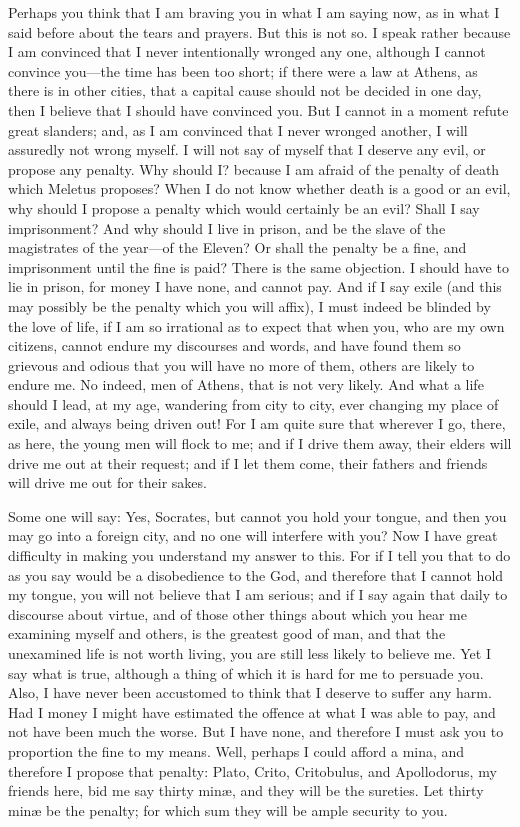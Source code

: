 \documentclass[11pt,letter]{article}
\begin{document}
\par  Perhaps you think that I am braving you in what I am saying now, as in what I said before about the tears and prayers. But this is not so. I speak rather because I am convinced that I never intentionally wronged any one, although I cannot convince you—the time has been too short; if there were a law at Athens, as there is in other cities, that a capital cause should not be decided in one day, then I believe that I should have convinced you. But I cannot in a moment refute great slanders; and, as I am convinced that I never wronged another, I will assuredly not wrong myself. I will not say of myself that I deserve any evil, or propose any penalty. Why should I? because I am afraid of the penalty of death which Meletus proposes? When I do not know whether death is a good or an evil, why should I propose a penalty which would certainly be an evil? Shall I say imprisonment? And why should I live in prison, and be the slave of the magistrates of the year—of the Eleven? Or shall the penalty be a fine, and imprisonment until the fine is paid? There is the same objection. I should have to lie in prison, for money I have none, and cannot pay. And if I say exile (and this may possibly be the penalty which you will affix), I must indeed be blinded by the love of life, if I am so irrational as to expect that when you, who are my own citizens, cannot endure my discourses and words, and have found them so grievous and odious that you will have no more of them, others are likely to endure me. No indeed, men of Athens, that is not very likely. And what a life should I lead, at my age, wandering from city to city, ever changing my place of exile, and always being driven out! For I am quite sure that wherever I go, there, as here, the young men will flock to me; and if I drive them away, their elders will drive me out at their request; and if I let them come, their fathers and friends will drive me out for their sakes.

\par  Some one will say: Yes, Socrates, but cannot you hold your tongue, and then you may go into a foreign city, and no one will interfere with you? Now I have great difficulty in making you understand my answer to this. For if I tell you that to do as you say would be a disobedience to the God, and therefore that I cannot hold my tongue, you will not believe that I am serious; and if I say again that daily to discourse about virtue, and of those other things about which you hear me examining myself and others, is the greatest good of man, and that the unexamined life is not worth living, you are still less likely to believe me. Yet I say what is true, although a thing of which it is hard for me to persuade you. Also, I have never been accustomed to think that I deserve to suffer any harm. Had I money I might have estimated the offence at what I was able to pay, and not have been much the worse. But I have none, and therefore I must ask you to proportion the fine to my means. Well, perhaps I could afford a mina, and therefore I propose that penalty: Plato, Crito, Critobulus, and Apollodorus, my friends here, bid me say thirty minæ, and they will be the sureties. Let thirty minæ be the penalty; for which sum they will be ample security to you.
\end{document}
